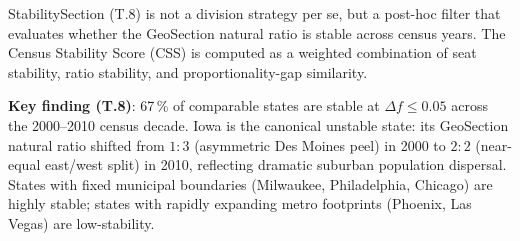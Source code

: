 StabilitySection (T.8) is not a division strategy per se, but a post-hoc
filter that evaluates whether the GeoSection natural ratio is stable across
census years.
The Census Stability Score (CSS) is computed as a weighted combination of
seat stability, ratio stability, and proportionality-gap similarity.

\textbf{Key finding (T.8)}: 67\,\% of comparable states are stable at
$\Delta f \leq 0.05$ across the 2000--2010 census decade.
Iowa is the canonical unstable state: its GeoSection natural ratio shifted from
$1:3$ (asymmetric Des Moines peel) in 2000 to $2:2$ (near-equal east/west split)
in 2010, reflecting dramatic suburban population dispersal.
States with fixed municipal boundaries (Milwaukee, Philadelphia, Chicago) are
highly stable; states with rapidly expanding metro footprints (Phoenix, Las Vegas)
are low-stability.
